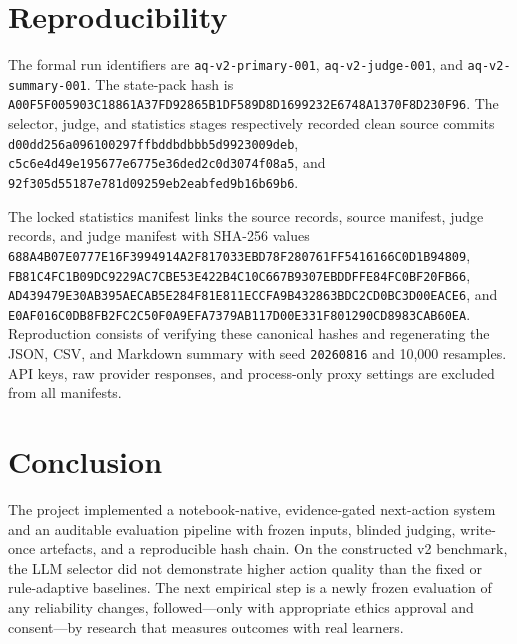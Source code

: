 \documentclass[final-report]{../project-plan/report-template}
\begin{document}
\section{Reproducibility}

The formal run identifiers are \texttt{aq-v2-primary-001},
\texttt{aq-v2-judge-001}, and \texttt{aq-v2-summary-001}. The state-pack hash is
\texttt{A00F5F005903C18861A37FD92865B1DF589D8D1699232E6748A1370F8D230F96}.
The selector, judge, and statistics stages respectively recorded clean source
commits \texttt{d00dd256a096100297ffbddbdbbb5d9923009deb},
\texttt{c5c6e4d49e195677e6775e36ded2c0d3074f08a5}, and
\texttt{92f305d55187e781d09259eb2eabfed9b16b69b6}.

The locked statistics manifest links the source records, source manifest, judge
records, and judge manifest with SHA-256 values
\texttt{688A4B07E0777E16F3994914A2F817033EBD78F280761FF5416166C0D1B94809},
\texttt{FB81C4FC1B09DC9229AC7CBE53E422B4C10C667B9307EBDDFFE84FC0BF20FB66},
\texttt{AD439479E30AB395AECAB5E284F81E811ECCFA9B432863BDC2CD0BC3D00EACE6},
and \texttt{E0AF016C0DB8FB2FC2C50F0A9EFA7379AB117D00E331F801290CD8983CAB60EA}.
Reproduction consists of verifying these canonical hashes and regenerating the
JSON, CSV, and Markdown summary with seed \texttt{20260816} and 10,000
resamples. API keys, raw provider responses, and process-only proxy settings are
excluded from all manifests.

\section{Conclusion}

The project implemented a notebook-native, evidence-gated next-action system and
an auditable evaluation pipeline with frozen inputs, blinded judging,
write-once artefacts, and a reproducible hash chain. On the constructed v2
benchmark, the LLM selector did not demonstrate higher action quality than the
fixed or rule-adaptive baselines. The next empirical step is a newly frozen
evaluation of any reliability changes, followed---only with appropriate ethics
approval and consent---by research that measures outcomes with real learners.

\end{document}
